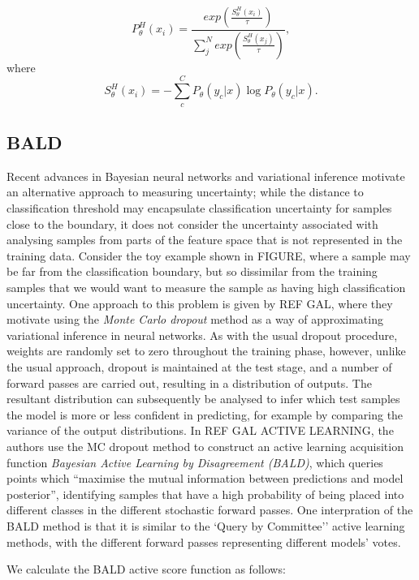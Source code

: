 \begin{equation}
P_{\theta}^{H} (x_i) = \frac{exp(\frac{S^{H}_{\theta}(x_i)}{\tau})}{\sum_{j}^{N} exp(\frac{S^{H}_{\theta}(x_j)}{\tau})},
\end{equation}
where
\begin{equation}
S^{H}_{\theta}(x_i) = - \sum_{c}^{C} P_{\theta}(y_c|x)\log P_{\theta}(y_c|x).
\end{equation}

\subsection{BALD}
Recent advances in Bayesian neural networks and variational inference motivate an alternative approach to measuring uncertainty; while the distance to classification threshold may encapsulate classification uncertainty for samples close to the boundary, it does not consider the uncertainty associated with analysing samples from parts of the feature space that is not represented in the training data. Consider the toy example shown in FIGURE, where a sample may be far from the classification boundary, but so dissimilar from the training samples that we would want to measure the sample as having high classification uncertainty. One approach to this problem is given by REF GAL, where they motivate using the \textit{Monte Carlo dropout} method as a way of approximating variational inference in neural networks. As with the usual dropout procedure, weights are randomly set to zero throughout the training phase, however, unlike the usual approach, dropout is maintained at the test stage, and a number of forward passes are carried out, resulting in a distribution of outputs. The resultant distribution can subsequently be analysed to infer which test samples the model is more or less confident in predicting, for example by comparing the variance of the output distributions. In REF GAL ACTIVE LEARNING, the authors use the MC dropout method to construct an active learning acquisition function \textit{Bayesian Active Learning by Disagreement (BALD)}, which queries points which ``maximise the mutual information between predictions and model posterior'', identifying samples that have a high probability of being placed into different classes in the different stochastic forward passes. One interpration of the BALD method is that it is similar to the `Query by Committee'' active learning methods, with the different forward passes representing different models' votes. 

We calculate the BALD active score function as follows:

